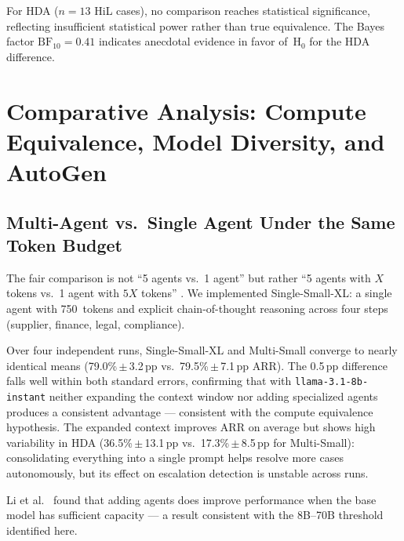 \documentclass[preprint,12pt,numrefs]{elsarticle}
\begin{document}
For HDA ($n=13$ HiL cases), no comparison reaches statistical
significance, reflecting insufficient statistical power rather than
true equivalence. The Bayes factor $\text{BF}_{10}=0.41$ indicates
anecdotal evidence in favor of~H$_0$ for the HDA difference.

\section{Comparative Analysis: Compute Equivalence, Model Diversity, and AutoGen}
\label{sec:comparative}

\subsection{Multi-Agent vs.\ Single Agent Under the Same Token Budget}

The fair comparison is not ``5 agents vs.\ 1 agent'' but rather ``5
agents with $X$ tokens vs.\ 1 agent with $5X$ tokens''
\citep{wu2023autogen}. We implemented Single-Small-XL: a single agent
with 750~tokens and explicit chain-of-thought reasoning across four
steps (supplier, finance, legal, compliance).

Over four independent runs, Single-Small-XL and Multi-Small converge
to nearly identical means (79.0\%\,$\pm$\,3.2\,pp vs.\
79.5\%\,$\pm$\,7.1\,pp ARR). The 0.5\,pp difference falls well within
both standard errors, confirming that with \texttt{llama-3.1-8b-instant}
neither expanding the context window nor adding specialized agents
produces a consistent advantage --- consistent with the compute
equivalence hypothesis. The expanded context improves ARR on average
but shows high variability in HDA (36.5\%\,$\pm$\,13.1\,pp vs.\
17.3\%\,$\pm$\,8.5\,pp for Multi-Small): consolidating everything into
a single prompt helps resolve more cases autonomously, but its effect
on escalation detection is unstable across runs.

Li et al.\ \citep{Li2024moreagents} found that adding agents does
improve performance when the base model has sufficient capacity --- a
result consistent with the 8B--70B threshold identified here.
\end{document}

